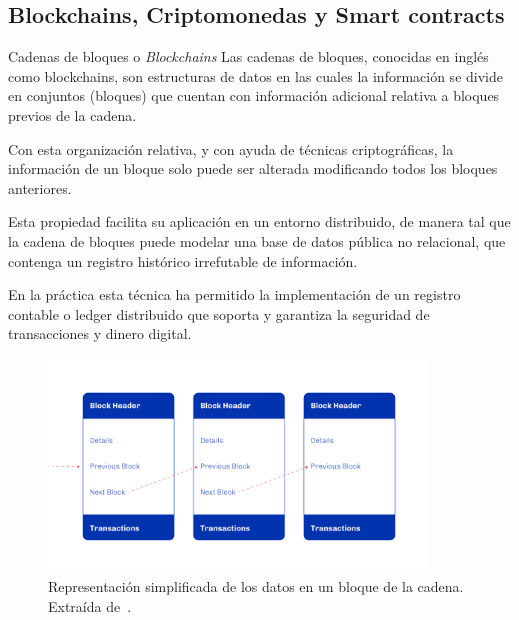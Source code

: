\documentclass{beamer}
\begin{document}
\subsection{Blockchains, Criptomonedas y Smart contracts}

\begin{frame}{Cadenas de bloques o \textit{Blockchains}}
Las cadenas de bloques, conocidas en inglés como blockchains, son estructuras de datos en las cuales la información se divide en conjuntos (bloques) que cuentan con información adicional relativa a bloques previos de la cadena.
\smallskip

\pause

Con esta organización relativa, y con ayuda de técnicas criptográficas, la información de un bloque solo puede ser alterada modificando todos los bloques anteriores.
\smallskip

\pause

Esta propiedad facilita su aplicación en un entorno distribuido, de manera tal que la cadena de bloques puede modelar una base de datos pública no relacional, que contenga un registro histórico irrefutable de información.
\smallskip

\pause

En la práctica esta técnica ha permitido la implementación de un registro contable o ledger distribuido que soporta y garantiza la seguridad de transacciones y dinero digital. 

\end{frame}


\begin{frame}

\begin{figure}
    \centering
    \includegraphics[width=0.9\textwidth]{Bloques.png}
    \caption[Representación simplificada de los datos en un bloque de la cadena.]{Representación simplificada de los datos en un bloque de la cadena. Extraída de~\cite{plutus-smart-contracts}.}\label{fig:Bloques}
\end{figure}


\end{frame}
\end{document}
